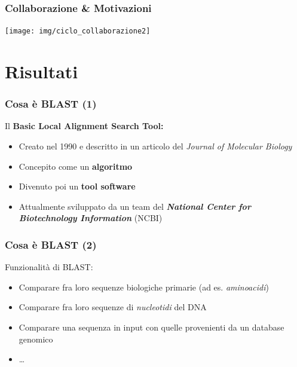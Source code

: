 \begin{frame}\frametitle{Collaborazione \& Motivazioni}

\begin{center}
    \texttt{[image: img/ciclo\_collaborazione2]}
\end{center}

\end{frame}

\section{Risultati}

\begin{frame}\frametitle{Cosa è BLAST (1)}

\Large{Il \textbf{\alert{B}asic \alert{L}ocal \alert{A}lignment \alert{S}earch \alert{T}ool:}}

\begin{itemize}[<+->]
\itemsep1pt\parskip0pt
\item
  Creato nel 1990 e descritto in un articolo del \emph{Journal of
  Molecular Biology}
\item
  Concepito come un \textbf{algoritmo}
\item
  Divenuto poi un \textbf{tool software}
\item
  Attualmente sviluppato da un team del \emph{\textbf{National Center
  for Biotechnology Information}} (NCBI)
\end{itemize}

\end{frame}

\begin{frame}\frametitle{Cosa è BLAST (2)}

\Large{Funzionalità di BLAST:}

\begin{itemize}[<+->]
\itemsep1pt\parskip0pt
\item
  Comparare fra loro sequenze biologiche primarie (ad es.
  \emph{aminoacidi})
\item
  Comparare fra loro sequenze di \emph{nucleotidi} del DNA
\item
  Comparare una sequenza in input con quelle provenienti da un database
  genomico
\item
  \ldots
\end{itemize}

\end{frame}

